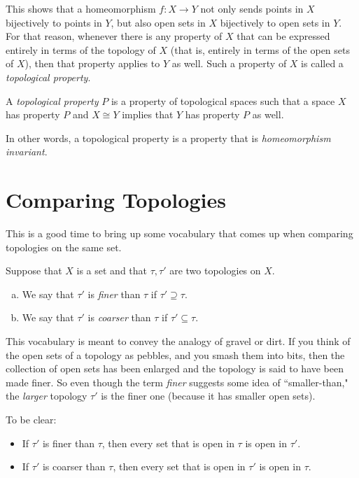 \documentclass[noname]{notes}
\begin{document}
This shows that a homeomorphism $f \colon X \to Y$ not only sends points in $X$ bijectively to points in $Y$, but also open sets in $X$ bijectively to open sets in $Y$. For that reason, whenever there is any property of $X$ that can be expressed entirely in terms of the topology of $X$ (that is, entirely in terms of the open sets of $X$), then that property applies to $Y$ as well. Such a property of $X$ is called a \emph{topological property}. 

\begin{definition}
	A \emph{topological property} $P$ is a property of topological spaces such that a space $X$ has property $P$ and $X \cong Y$ implies that $Y$ has property $P$ as well. 
\end{definition}

In other words, a topological property is a property that is \emph{homeomorphism invariant}. 




\section{Comparing Topologies}

This is a good time to bring up some vocabulary that comes up when comparing topologies on the same set. 

\begin{definition}
	Suppose that $X$ is a set and that $\tau, \tau'$ are two topologies on $X$. 
	\begin{enumerate}[(a)]
		\item We say that $\tau'$ is \emph{finer} than $\tau$ if $\tau' \supseteq \tau$. 
		\item We say that $\tau'$ is \emph{coarser} than $\tau$ if $\tau' \subseteq \tau$. 
	\end{enumerate}
\end{definition}

This vocabulary is meant to convey the analogy of gravel or dirt. If you think of the open sets of a topology as pebbles, and you smash them into bits, then the collection of open sets has been enlarged and the topology is said to have been made finer. So even though the term \emph{finer} suggests some idea of ``smaller-than," the \emph{larger} topology $\tau'$ is the finer one (because it has smaller open sets). 

To be clear: 
\begin{itemize}
	\item If $\tau'$ is finer than $\tau$, then every set that is open in $\tau$ is open in $\tau'$. 
	\item If $\tau'$ is coarser than $\tau$, then every set that is open in $\tau'$ is open in $\tau$. 
\end{itemize}
\end{document}
